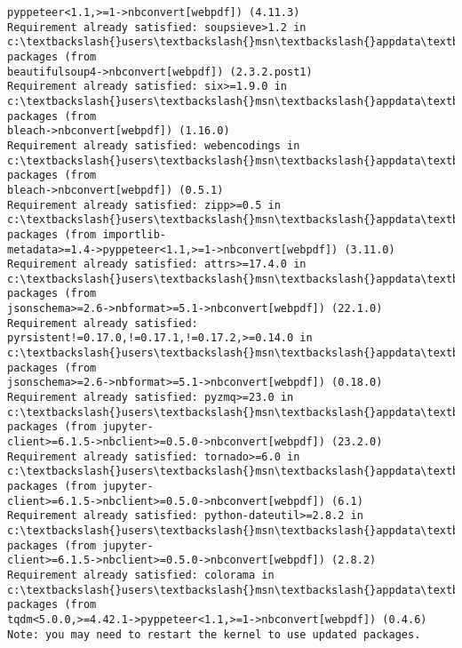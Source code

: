 \documentclass[11pt]{article}
\begin{document}
\begin{Verbatim}[commandchars=\\\{\}]
pyppeteer<1.1,>=1->nbconvert[webpdf]) (4.11.3)
Requirement already satisfied: soupsieve>1.2 in
c:\textbackslash{}users\textbackslash{}msn\textbackslash{}appdata\textbackslash{}local\textbackslash{}anaconda3\textbackslash{}lib\textbackslash{}site-packages (from
beautifulsoup4->nbconvert[webpdf]) (2.3.2.post1)
Requirement already satisfied: six>=1.9.0 in
c:\textbackslash{}users\textbackslash{}msn\textbackslash{}appdata\textbackslash{}local\textbackslash{}anaconda3\textbackslash{}lib\textbackslash{}site-packages (from
bleach->nbconvert[webpdf]) (1.16.0)
Requirement already satisfied: webencodings in
c:\textbackslash{}users\textbackslash{}msn\textbackslash{}appdata\textbackslash{}local\textbackslash{}anaconda3\textbackslash{}lib\textbackslash{}site-packages (from
bleach->nbconvert[webpdf]) (0.5.1)
Requirement already satisfied: zipp>=0.5 in
c:\textbackslash{}users\textbackslash{}msn\textbackslash{}appdata\textbackslash{}local\textbackslash{}anaconda3\textbackslash{}lib\textbackslash{}site-packages (from importlib-
metadata>=1.4->pyppeteer<1.1,>=1->nbconvert[webpdf]) (3.11.0)
Requirement already satisfied: attrs>=17.4.0 in
c:\textbackslash{}users\textbackslash{}msn\textbackslash{}appdata\textbackslash{}local\textbackslash{}anaconda3\textbackslash{}lib\textbackslash{}site-packages (from
jsonschema>=2.6->nbformat>=5.1->nbconvert[webpdf]) (22.1.0)
Requirement already satisfied: pyrsistent!=0.17.0,!=0.17.1,!=0.17.2,>=0.14.0 in
c:\textbackslash{}users\textbackslash{}msn\textbackslash{}appdata\textbackslash{}local\textbackslash{}anaconda3\textbackslash{}lib\textbackslash{}site-packages (from
jsonschema>=2.6->nbformat>=5.1->nbconvert[webpdf]) (0.18.0)
Requirement already satisfied: pyzmq>=23.0 in
c:\textbackslash{}users\textbackslash{}msn\textbackslash{}appdata\textbackslash{}local\textbackslash{}anaconda3\textbackslash{}lib\textbackslash{}site-packages (from jupyter-
client>=6.1.5->nbclient>=0.5.0->nbconvert[webpdf]) (23.2.0)
Requirement already satisfied: tornado>=6.0 in
c:\textbackslash{}users\textbackslash{}msn\textbackslash{}appdata\textbackslash{}local\textbackslash{}anaconda3\textbackslash{}lib\textbackslash{}site-packages (from jupyter-
client>=6.1.5->nbclient>=0.5.0->nbconvert[webpdf]) (6.1)
Requirement already satisfied: python-dateutil>=2.8.2 in
c:\textbackslash{}users\textbackslash{}msn\textbackslash{}appdata\textbackslash{}local\textbackslash{}anaconda3\textbackslash{}lib\textbackslash{}site-packages (from jupyter-
client>=6.1.5->nbclient>=0.5.0->nbconvert[webpdf]) (2.8.2)
Requirement already satisfied: colorama in
c:\textbackslash{}users\textbackslash{}msn\textbackslash{}appdata\textbackslash{}local\textbackslash{}anaconda3\textbackslash{}lib\textbackslash{}site-packages (from
tqdm<5.0.0,>=4.42.1->pyppeteer<1.1,>=1->nbconvert[webpdf]) (0.4.6)
Note: you may need to restart the kernel to use updated packages.
    \end{Verbatim}
\end{document}
